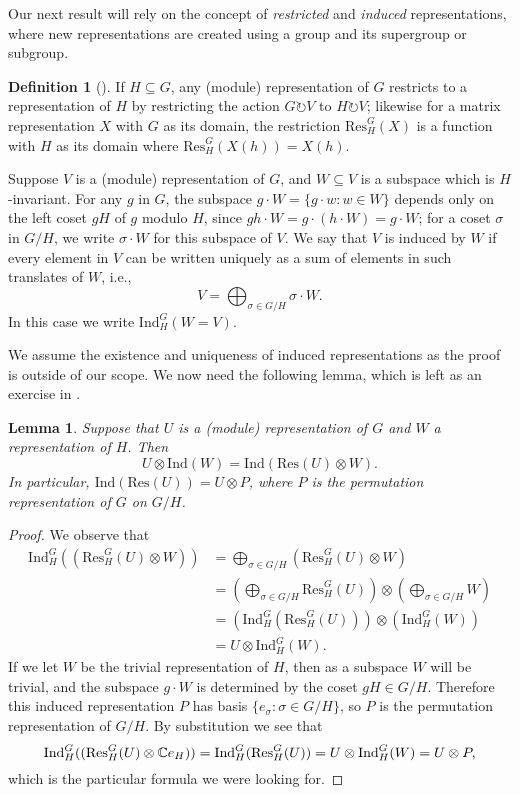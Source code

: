 \documentclass[12pt,twoside]{reedthesis}
\theoremstyle{plain}   %
\newtheorem{lemma}{Lemma}[section]
\theoremstyle{definition}
\newtheorem{defn}{Definition}[section]
\theoremstyle{remark}
\numberwithin{equation}{section}
\def\ind{\mathrm{Ind}}
\def\res{\mathrm{Res}}
\def\acts{\circlearrowright} %
\begin{document}
  Our next result will rely on the concept of \emph{restricted} and \emph{induced} representations, where new representations are created using a group and its supergroup or subgroup.
  \begin{defn}[{\cite[Section 3.3]{fulton2004}}]
    If $H \subseteq G$, any (module) representation of $G$ restricts to a representation of $H$ by restricting the action $G \acts V$ to $H \acts V$; likewise for a matrix representation $X$ with $G$ as its domain,
    the restriction $\res_H^G (X)$ is a function with $H$ as its domain where $\res_H^G(X(h)) = X(h)$.
    \par
    Suppose $V$ is a (module) representation of $G$, and $W \subseteq V$ is a subspace which is $H$-invariant.
    For any $g$ in $G$, the subspace $g \cdot W = \{ g \cdot w: w \in W\}$ depends only on the left coset $gH$ of $g$ modulo $H$, since $gh \cdot W = g \cdot (h \cdot W) = g \cdot W$;
    for a coset $\sigma$ in $G/H$, we write $\sigma \cdot W$ for this subspace of $V$. We say that $V$ is induced by $W$ if every element in $V$ can be written uniquely as a sum of elements in such translates of $W$, i.e.,
    \[ V = \bigoplus_{\sigma \in G/H} \sigma \cdot W.\]
    In this case we write $\ind^G_H (W = V)$.
  \end{defn}
  We assume the existence and uniqueness of induced representations as the proof is outside of our scope.
  We now need the following lemma, which is left as an exercise in \cite[Exercise 3.16]{fulton2004}.
  \begin{lemma}
    Suppose that $U$ is a (module) representation of $G$ and $W$ a representation of $H$. Then
    \[ U \otimes \ind (W) = \ind( \res (U) \otimes W).\]
    In particular, $\ind ( \res (U)) = U \otimes P$, where $P$ is the permutation representation of $G$ on $G/H$.
  \end{lemma}
  \begin{proof}
    We observe that
    \begin{align*}
      \ind^G_H ((\res^G_H(U) \otimes W)) &= \bigoplus_{\sigma \in G/H} ( \res^G_H(U) \otimes W) \\
                                       &= (\bigoplus_{\sigma \in G/H}  \res^G_H(U)) \otimes (\bigoplus_{\sigma \in G/H} W) \\
                                       &= ( \ind^G_H (\res^G_H(U))) \otimes ( \ind^G_H ( W)) \\
                                       &= U \otimes \ind^G_H (W).
    \end{align*}
    If we let $W$ be the trivial representation of $H$, then as a subspace $W$ will be trivial, and the subspace $g \cdot W$ is determined by the coset $gH \in G/H$. Therefore
    this induced representation $P$ has basis $\{e_\sigma : \sigma \in G/H\}$,
    so $P$ is the permutation representation of $G/H$.
    By substitution we see that
    \[ \ind^G_H ((\res^G_H(U) \otimes \CC e_H)) =  \ind^G_H (\res^G_H(U)) = U \otimes \ind^G_H (W) = U \otimes P,\]
    which is the particular formula we were looking for.
  \end{proof}
\end{document}
